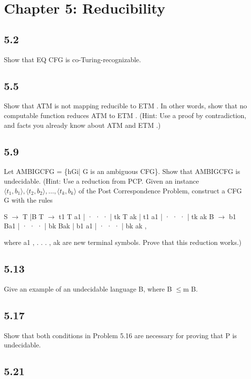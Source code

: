 \section*{Chapter 5: Reducibility}

\subsection*{5.2}

Show that EQ CFG is co-Turing-recognizable.


\subsection*{5.5}

Show that ATM is not mapping reducible to ETM . In other words, show that no computable function reduces ATM to ETM . (Hint: Use a proof by contradiction, and facts you already know about ATM and ETM .)


\subsection*{5.9}

Let AMBIGCFG = \{hGi| G is an ambiguous CFG\}. Show that AMBIGCFG is undecidable. (Hint: Use a reduction from PCP. Given an instance $\langle t_1, b_1\rangle, \langle t_2, b_2\rangle, \ldots, \langle t_k, b_k\rangle$ of the Post Correspondence Problem, construct a CFG G with the rules

S $\to$ T |B T $\to$ t1 T a1 | · · · | tk T ak | t1 a1 | · · · | tk ak B $\to$ b1 Ba1 | · · · | bk Bak | b1 a1 | · · · | bk ak ,

where a1 , . . . , ak are new terminal symbols. Prove that this reduction works.)


\subsection*{5.13}

Give an example of an undecidable language B, where B $\le$m B.


\subsection*{5.17}

Show that both conditions in Problem 5.16 are necessary for proving that P is undecidable.


\subsection*{5.21}

